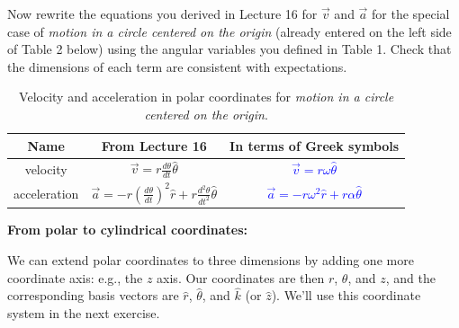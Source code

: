 \documentclass[11pt, letterpaper, openany]{book}
\newenvironment{exercise}[1][Exercise]{%
  \tcolorbox[blanker, breakable, left=1em,
    before skip=1em, after skip=1em,
    borderline west={3pt}{0pt}{PhysNavy},
    colback=PhysCream,
    before upper={\textcolor{PhysNavy}{\sffamily\bfseries #1:}\space}
  ]%
}{%
  \endtcolorbox%
}
\begin{document}
\begin{exercise}[Exercise 2]
Now rewrite the equations you derived in Lecture 16 for $\vec{v}$ and $\vec{a}$ for the special case of \textit{motion in a circle centered on the origin} (already entered on the left side of Table 2 below) using the angular variables you defined in Table 1. Check that the dimensions of each term are consistent with expectations.

\begin{table}[h!]
\centering
\caption{Velocity and acceleration in polar coordinates for \textit{motion in a circle centered on the origin}.}
\renewcommand{\arraystretch}{2}
\begin{tabular}{|c|c||c|}
\hline
Name & From Lecture 16 & In terms of Greek symbols \\ \hline
velocity & $\vec{v} = r\frac{d\theta}{dt}\hat{\theta}$ & \textcolor{blue}{$\vec{v} = r\omega\hat{\theta}$} \\ \hline
acceleration & $\vec{a} = -r\left(\frac{d\theta}{dt}\right)^2\hat{r} + r\frac{d^2\theta}{dt^2}\hat{\theta}$ & \textcolor{blue}{$\vec{a} = -r\omega^2\hat{r} + r\alpha\hat{\theta}$} \\ \hline
\end{tabular}
\end{table}
\end{exercise}

\textbf{From polar to cylindrical coordinates:}

We can extend polar coordinates to three dimensions by adding one more coordinate axis: e.g., the $z$ axis. Our coordinates are then $r$, $\theta$, and $z$, and the corresponding basis vectors are $\hat{r}$, $\hat{\theta}$, and $\hat{k}$ (or $\hat{z}$). We'll use this coordinate system in the next exercise.
\end{document}
